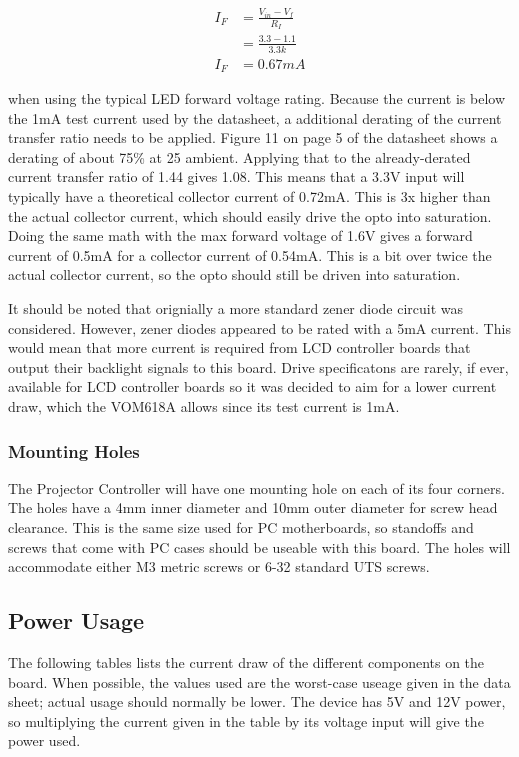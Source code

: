 \documentclass{article}
\begin{document}
\begin{align*}
    I_F &= \frac{V_{in} - V_f}{R_I} \\
    &= \frac{3.3 - 1.1}{3.3k} \\
    I_F &= 0.67mA
\end{align*}

when using the typical LED forward voltage rating.  Because the current is below the 1mA test
current used by the datasheet, a additional derating of the current transfer ratio needs to be
applied.  Figure 11 on page 5 of the datasheet shows a derating of about 75\% at 25\textcelsius{}
ambient.  Applying that to the already-derated current transfer ratio of 1.44 gives 1.08.  This
means that a 3.3V input will typically have a theoretical collector current of 0.72mA.  This is 3x
higher than the actual collector current, which should easily drive the opto into saturation.  Doing
the same math with the max forward voltage of 1.6V gives a forward current of 0.5mA for a collector
current of 0.54mA.  This is a bit over twice the actual collector current, so the opto should still
be driven into saturation.

It should be noted that orignially a more standard zener diode circuit was considered.  However,
zener diodes appeared to be rated with a 5mA current.  This would mean that more current is required
from LCD controller boards that output their backlight signals to this board.  Drive specificatons
are rarely, if ever, available for LCD controller boards so it was decided to aim for a lower
current draw, which the VOM618A allows since its test current is 1mA.

\subsubsection{Mounting Holes} \label{sssec:MountingHoles}
The Projector Controller will have one mounting hole on each of its four corners.  The holes have a
4mm inner diameter and 10mm outer diameter for screw head clearance.  This is the same size used for
PC motherboards, so standoffs and screws that come with PC cases should be useable with this board.
The holes will accommodate either M3 metric screws or 6-32 standard UTS screws.


\subsection{Power Usage} \label{ssec:PowerUsage}
The following tables lists the current draw of the different components on the board.  When
possible, the values used are the worst-case useage given in the data sheet; actual usage should
normally be lower.  The device has 5V and 12V power, so multiplying the current given in the table
by its voltage input will give the power used.
\end{document}
